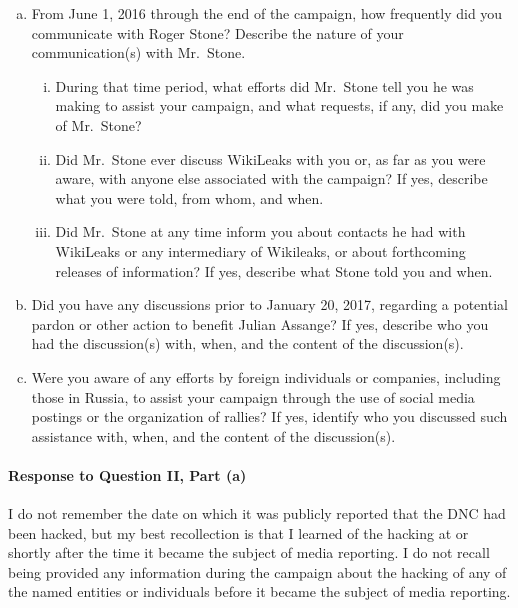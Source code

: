 \begin{enumerate}[a.]
\item From June 1, 2016 through the end of the campaign, how frequently did you communicate with Roger Stone? Describe the nature of your communication(s) with Mr.~Stone.

\begin{enumerate}[i.]

\item During that time period, what efforts did Mr.~Stone tell you he was making to assist your campaign, and what requests, if any, did you make of Mr.~Stone?

\item Did Mr.~Stone ever discuss WikiLeaks with you or, as far as you were aware, with anyone else associated with the campaign?
If yes, describe what you were told, from whom, and when.

\item Did Mr.~Stone at any time inform you about contacts he had with WikiLeaks or any intermediary of Wikileaks, or about forthcoming releases of information?
If yes, describe what Stone told you and when.

\end{enumerate}

\item Did you have any discussions prior to January 20, 2017, regarding a potential pardon or other action to benefit Julian Assange?
If yes, describe who you had the discussion(s) with, when, and the content of the discussion(s).

\item Were you aware of any efforts by foreign individuals or companies, including those in Russia, to assist your campaign through the use of social media postings or the organization of rallies?
If yes, identify who you discussed such assistance with, when, and the content of the discussion(s).

\end{enumerate}

\paragraph*{Response to Question II, Part (a)}

I do not remember the date on which it was publicly reported that the DNC had been hacked, but my best recollection is that I learned of the hacking at or shortly after the time it became the subject of media reporting.
I do not recall being provided any information during the campaign about the hacking of any of the named entities or individuals before it became the subject of media reporting.

